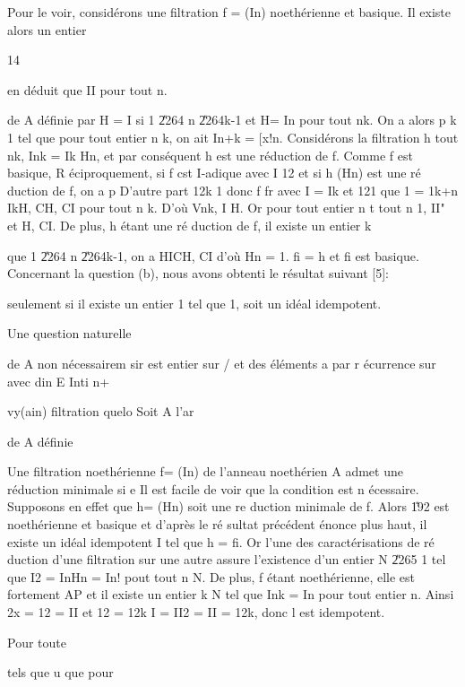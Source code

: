 \documentclass[11pt, twoside]{article}
\begin{document}
Pour le voir, consid\'{e}rons une filtration f = (In) noeth\'{e}rienne et
basique. Il existe alors un entier

14

\bigskip 

en d\'{e}duit que II pour tout n.

de A d\'{e}finie par H = I si 1 \U{2264} n \U{2264}k-1 et H= In pour tout
nk. On a alors p k\TEXTsymbol{>} 1 tel que pour tout entier n \TEXTsymbol{>}%
k, on ait In+k = [x!n. Consid\'{e}rons la filtration h tout nk, Ink = Ik Hn,
et par cons\'{e}quent h est une r\'{e}duction de f. Comme f est basique, R%
\'{e}ciproquement, si f cst I-adique avec I 12 et si h (Hn) est une r\'{e}%
duction de f, on a p D'autre part 12k 1 donc f fr avec I = Ik et 121 que 1 =
1k+n IkH, CH, CI pour tout n\TEXTsymbol{>} k. D'o\`{u} Vnk, I H. Or pour
tout entier n t tout n 1, II" et H, CI. De plus, h \'{e}tant une r\'{e}%
duction de f, il existe un entier k

que 1 \U{2264} n \U{2264}k-1, on a HICH, CI d'o\`{u} Hn = 1. fi = h et fi
est basique. Concernant la question (b), nous avons obtenti le r\'{e}sultat
suivant [5]:

seulement si il existe un entier 1 tel que 1, soit un id\'{e}al idempotent.

Une question naturelle

de A non n\'{e}cessairem sir est entier sur / et des \'{e}l\'{e}ments a par r%
\'{e}currence sur avec din E Inti n+

vy(ain) filtration quelo Soit A l'ar

de A d\'{e}finie

Une filtration noeth\'{e}rienne f= (In) de l'anneau noeth\'{e}rien A admet
une r\'{e}duction minimale si e Il est facile de voir que la condition est n%
\'{e}cessaire. Supposons en effet que h= (Hn) soit une re duction minimale
de f. Alors \U{192} est noeth\'{e}rienne et basique et d'apr\`{e}s le r\'{e}%
sultat pr\'{e}c\'{e}dent \'{e}nonce plus haut, il existe un id\'{e}al
idempotent I tel que h = fi. Or l'une des caract\'{e}risations de r\'{e}%
duction d'une filtration sur une autre assure l'existence d'un entier N%
\U{2265} 1 tel que I2 = InHn = In! pout tout n \TEXTsymbol{>} N. De plus, f 
\'{e}tant noeth\'{e}rienne, elle est fortement AP et il existe un entier k 
\TEXTsymbol{>} N tel que Ink = In pour tout entier n. Ainsi 2x = 12 = II et
12 = 12k I = II2 = II = 12k, donc l est idempotent.

Pour toute

tels que u que pour
\end{document}
